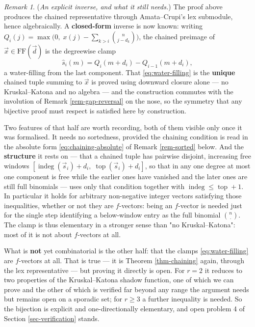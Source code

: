 \documentclass[11pt, a4paper, abstract=yes]{scrartcl}
\theoremstyle{definition}
\theoremstyle{remark}
\newtheorem{remark}[definition]{Remark}
\theoremstyle{plain}
\newcommand{\indeg}{\operatorname{indeg}}
\newcommand{\tp}{\operatorname{top}}
\begin{document}
\begin{remark}
(\emph{An explicit inverse, and what it still needs.}) The proof above produces the chained representative
through Amata--Crupi's lex submodule, hence algebraically. A \textbf{closed-form} inverse is now known:
writing \(Q_i(j)=\max\bigl(0,\;x(j)-\sum_{k>i}\binom n{j-d_k}\bigr)\), the chained preimage of
\(\vec x\in\mathrm{FF}(\vec d)\) is the degreewise clamp
\begin{equation}\label{eq:water-filling}
  \hat s_i(m)=Q_i(m+d_i)-Q_{i-1}(m+d_i),
\end{equation}
a water-filling from the last component. That \eqref{eq:water-filling} is the \textbf{unique} chained tuple
summing to \(\vec x\) is proved using downward closure alone --- no Kruskal--Katona and no algebra ---
and the construction commutes with the involution of Remark \ref{rem-gap-reversal} on the nose, so the
symmetry that any bijective proof must respect is satisfied here by construction.

Two features of that half are worth recording, both of them visible only once it was formalised. It
needs no sortedness, provided the chaining condition is read in the absolute form
\eqref{eq:chaining-absolute} of Remark \ref{rem-sorted} below. And the \textbf{structure} it rests on --- that a chained tuple has pairwise
disjoint, increasing free windows \([\indeg(\vec s_i)+d_i,\;\tp(\vec s_i)+d_i]\), so that in any one
degree at most one component is free while the earlier ones have vanished and the later ones are still
full binomials --- uses only that condition together with
\(\indeg\le\tp+1\). In particular it holds for arbitrary non-negative integer vectors satisfying those
inequalities, whether or not they are \(f\)-vectors: being an \(f\)-vector is needed just for the
single step identifying a below-window entry as the full binomial \(\binom n{\cdot}\). The clamp is
thus elementary in a stronger sense than "no Kruskal--Katona": most of it is not about \(f\)-vectors
at all.

What is \textbf{not} yet combinatorial is the other half: that the clamps \eqref{eq:water-filling} are
\(f\)-vectors at all. That is true --- it is Theorem \ref{thm-chaining} again, through the lex
representative --- but proving it directly is open. For \(r=2\) it reduces to two properties of the
Kruskal--Katona shadow function, one of which we can prove and the other of which is verified far
beyond any range the argument needs but remains open on a sporadic set; for \(r\ge3\) a further
inequality is needed. So the bijection is explicit and one-directionally elementary, and open
problem 4 of Section \ref{sec-verification} stands.
\label{rem-explicit-inverse}
\end{remark}
\end{document}
